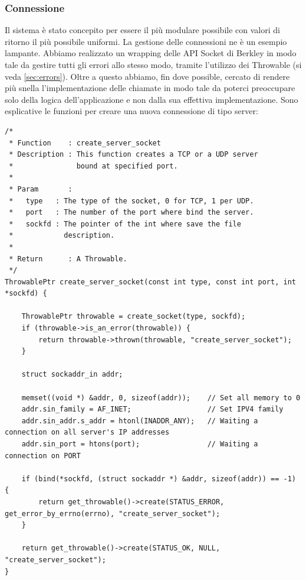 \documentclass[italian]{tktltiki2}
\begin{document}
\subsubsection*{Connessione}
Il sistema è stato concepito per essere il più modulare possibile con valori di ritorno il più possibile uniformi. La gestione delle connessioni ne è un esempio lampante. Abbiamo realizzato un wrapping delle API Socket di Berkley in modo tale da gestire tutti gli errori allo stesso modo, tramite l'utilizzo dei Throwable (si veda \ref{sec:errors}). Oltre a questo abbiamo, fin dove possible, cercato di rendere più snella l'implementazione delle chiamate in modo tale da poterci preoccupare solo della logica dell'applicazione e non dalla sua effettiva implementazione. Sono esplicative le funzioni per creare una nuova connessione di tipo server:
\begin{lstlisting}
/*
 * Function    : create_server_socket
 * Description : This function creates a TCP or a UDP server
 *               bound at specified port.
 *
 * Param       :
 *   type   : The type of the socket, 0 for TCP, 1 per UDP.
 *   port   : The number of the port where bind the server.
 *   sockfd : The pointer of the int where save the file
 *            description.
 *
 * Return      : A Throwable.
 */
ThrowablePtr create_server_socket(const int type, const int port, int *sockfd) {

    ThrowablePtr throwable = create_socket(type, sockfd);
    if (throwable->is_an_error(throwable)) {
        return throwable->thrown(throwable, "create_server_socket");
    }

    struct sockaddr_in addr;

    memset((void *) &addr, 0, sizeof(addr));    // Set all memory to 0
    addr.sin_family = AF_INET;                  // Set IPV4 family
    addr.sin_addr.s_addr = htonl(INADDR_ANY);   // Waiting a connection on all server's IP addresses
    addr.sin_port = htons(port);                // Waiting a connection on PORT

    if (bind(*sockfd, (struct sockaddr *) &addr, sizeof(addr)) == -1) {
        return get_throwable()->create(STATUS_ERROR, get_error_by_errno(errno), "create_server_socket");
    }

    return get_throwable()->create(STATUS_OK, NULL, "create_server_socket");
}
\end{lstlisting}
\end{document}
